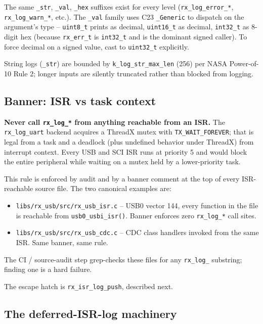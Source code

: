 The same \texttt{\_str}, \texttt{\_val}, \texttt{\_hex} suffixes exist
for every level (\texttt{rx\_log\_error\_*}, \texttt{rx\_log\_warn\_*},
etc.). The \texttt{\_val} family uses C23 \texttt{\_Generic} to dispatch
on the argument's type -- \texttt{uint8\_t} prints as decimal,
\texttt{uint16\_t} as decimal, \texttt{int32\_t} as 8-digit hex (because
\texttt{rx\_err\_t} is \texttt{int32\_t} and is the dominant signed
caller). To force decimal on a signed value, cast to \texttt{uint32\_t}
explicitly.

String logs (\texttt{\_str}) are bounded by
\texttt{k\_log\_str\_max\_len} (256) per NASA Power-of-10 Rule 2; longer
inputs are silently truncated rather than blocked from logging.

\subsection{Banner: ISR vs task context}

\textbf{Never call \texttt{rx\_log\_*} from anything reachable from an
ISR.} The \texttt{rx\_log\_uart} backend acquires a ThreadX mutex with
\texttt{TX\_WAIT\_FOREVER}; that is legal from a task and a deadlock
(plus undefined behavior under ThreadX) from interrupt context. Every
USB and SCI ISR runs at priority 5 and would block the entire
peripheral while waiting on a mutex held by a lower-priority task.

This rule is enforced by audit and by a banner comment at the top of
every ISR-reachable source file. The two canonical examples are:

\begin{itemize}
  \item \texttt{libs/rx\_usb/src/rx\_usb\_isr.c} -- USB0 vector 144,
        every function in the file is reachable from
        \texttt{usb0\_usbi\_isr()}. Banner enforces zero
        \texttt{rx\_log\_*} call sites.
  \item \texttt{libs/rx\_usb/src/rx\_usb\_cdc.c} -- CDC class handlers
        invoked from the same ISR. Same banner, same rule.
\end{itemize}

The CI / source-audit step grep-checks these files for any
\texttt{rx\_log\_} substring; finding one is a hard failure.

The escape hatch is \texttt{rx\_isr\_log\_push}, described next.

\subsection{The deferred-ISR-log machinery}

